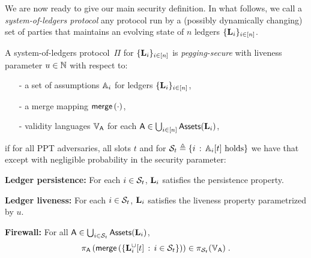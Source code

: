 
We are now ready to give our main security definition.
In what follows, we call a \emph{system-of-ledgers protocol} any protocol run by a
(possibly dynamically changing) set of parties that maintains an evolving state
of $n$ ledgers $\{\Ledger_i\}_{i\in[n]}$.

\begin{definition}
  \label{def:security}
  A system-of-ledgers protocol~$\Pi$ for $\{\Ledger_i\}_{i\in[n]}$ is
  \emph{pegging-secure} with liveness parameter $u\in\N$
  with respect to:
  \begin{itemize}
    \item[-]
      a set of assumptions $\Assum_i$ for ledgers $\{\Ledger_i\}_{i\in[n]}$,
    \item[-]
      a merge mapping $\merge\left(\cdot\right)$,
    \item[-]
      validity languages $\ValLang_\Asset$ for each %
      $\Asset\in\bigcup_{i\in[n]}\Assets(\Ledger_i)$,
  \end{itemize}
  if for all PPT adversaries, all slots $t$
  and for
  $
  \Secure_t\defeq\setd{i}{\Assum_i[t] \text{ holds}}
  $
  we have that except with negligible probability in the security parameter:
  \begin{description}
    \item \textbf{Ledger persistence:}
      For each $i\in\Secure_t$, $\Ledger_i$ satisfies the persistence property. %
    \item \textbf{Ledger liveness:}
      For each $i\in\Secure_t$, $\Ledger_i$ satisfies the liveness property para\-metrized by $u$.
    \item \textbf{Firewall:}
      For all $\Asset\in\bigcup_{i\in\Secure_t}\Assets(\Ledger_i)$,
      $$
      \proj_{\Asset}\left(
        \merge\left(
          \setd
            {\Ledger_i^{\cup}[t]}
            {i\in\Secure_t}
        \right)
      \right)
      \in
      \proj_{\Secure_t}(\ValLang_{\Asset})
      \; .
      $$
  \end{description}
\end{definition}

